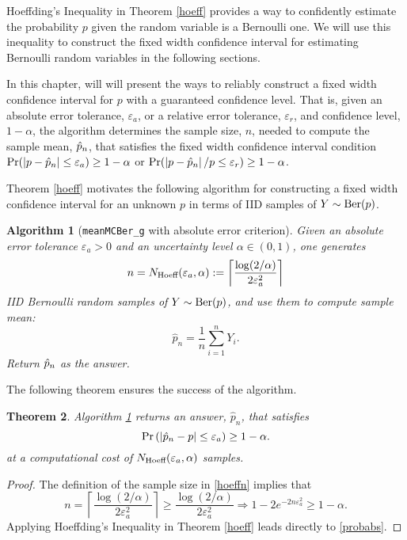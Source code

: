 \documentclass{iitthesis}
\newtheorem{theorem}{Theorem}[section]
\newtheorem{algorithm}[theorem]{Algorithm}
\theoremstyle{definition}
\begin{document}
Hoeffding's Inequality in Theorem \ref{hoeff} provides a way to confidently estimate the probability $p$ given the random variable is a Bernoulli one. We will use this inequality to construct the fixed width confidence interval for estimating Bernoulli random variables in the following sections.

In this chapter, will will present the ways to reliably construct a fixed width confidence interval for $p$ with a guaranteed confidence level. That is, given an absolute error tolerance, $\varepsilon_a$, or a relative error tolerance, $\varepsilon_r$, and confidence level, $1-\alpha$, the algorithm determines the sample size, $n$, needed to compute the sample mean, $\hat{p}_n$, that satisfies the fixed width confidence interval condition $\Pr(\left \lvert p-\hat{p}_n \right \rvert\leq \varepsilon_a) \geq 1-\alpha$ or $\Pr(\left \lvert p-\hat{p}_n \right \rvert/p\leq \varepsilon_r) \geq 1-\alpha$.  

 \label{sec:meanMCberg}

Theorem \ref{hoeff} motivates the following algorithm for constructing a fixed width confidence interval for an unknown $p$ in terms of IID samples of $Y\sim \operatorname{Ber}(p)$.
\begin{algorithm}[{\tt meanMCBer\_g} with absolute error criterion]\label{algabs}
Given an absolute error tolerance $\varepsilon_a > 0$ and an uncertainty level $\alpha \in (0,1)$, one generates
\begin{equation}\label{hoeffn}
n = N_{\text{Hoeff}}(\varepsilon_a,\alpha):= \left \lceil  \frac{\log(2/\alpha)}{2\varepsilon_a^2} \right \rceil
\end{equation}
IID Bernoulli random samples of $Y \sim \operatorname{Ber}(p)$, and use them to compute sample mean:
\begin{equation} \label{abserrp}
\hat{p}_n = \frac1n\sum_{i =1}^n Y_i.
\end{equation}
Return $\hat{p}_n$ as the answer.
\end{algorithm}
The following theorem ensures the success of the algorithm.
\begin{theorem}
Algorithm \ref{algabs} returns an answer, $\hat{p}_n$, that satisfies 
\begin{equation}\label{probabs}
\Pr\left(\left \lvert \hat{p}_n -p \right \rvert \leq \varepsilon_a\right) \geq 1-\alpha.
\end{equation}
at a computational cost of $N_{\text{Hoeff}}(\varepsilon_a,\alpha)$ samples.
\end{theorem}
\begin{proof}
The definition of the sample size in \eqref{hoeffn} implies that
\begin{equation*}
n = \left \lceil \frac{\log(2/\alpha)}{2\varepsilon_a^2} \right \rceil \geq  \frac{\log(2/\alpha)}{2\varepsilon_a^2} \Rightarrow 
1- 2e^{-2n\varepsilon_a^2} \geq 1-\alpha.
\end{equation*}
Applying Hoeffding's Inequality in Theorem \ref{hoeff} leads directly to \eqref{probabs}. 
\end{proof}
\end{document}

